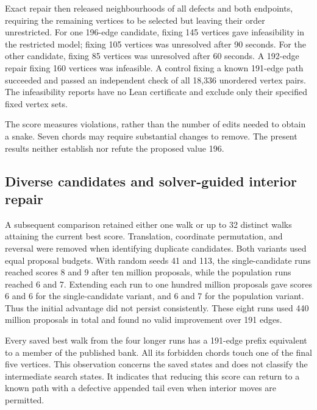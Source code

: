 \documentclass[11pt,a4paper]{article}
\theoremstyle{definition}
\theoremstyle{remark}
\begin{document}
Exact repair then released neighbourhoods of all defects and both endpoints, requiring the remaining vertices to be selected but leaving their order unrestricted. For one 196-edge candidate, fixing 145 vertices gave infeasibility in the restricted model; fixing 105 vertices was unresolved after 90 seconds. For the other candidate, fixing 85 vertices was unresolved after 60 seconds. A 192-edge repair fixing 160 vertices was infeasible. A control fixing a known 191-edge path succeeded and passed an independent check of all 18,336 unordered vertex pairs. The infeasibility reports have no Lean certificate and exclude only their specified fixed vertex sets.

The score measures violations, rather than the number of edits needed to obtain a snake. Seven chords may require substantial changes to remove. The present results neither establish nor refute the proposed value 196.

\subsection{Diverse candidates and solver-guided interior repair}
A subsequent comparison retained either one walk or up to 32 distinct walks attaining the current best score. Translation, coordinate permutation, and reversal were removed when identifying duplicate candidates. Both variants used equal proposal budgets. With random seeds 41 and 113, the single-candidate runs reached scores 8 and 9 after ten million proposals, while the population runs reached 6 and 7. Extending each run to one hundred million proposals gave scores 6 and 6 for the single-candidate variant, and 6 and 7 for the population variant. Thus the initial advantage did not persist consistently. These eight runs used 440 million proposals in total and found no valid improvement over 191 edges.

Every saved best walk from the four longer runs has a 191-edge prefix equivalent to a member of the published bank. All its forbidden chords touch one of the final five vertices. This observation concerns the saved states and does not classify the intermediate search states. It indicates that reducing this score can return to a known path with a defective appended tail even when interior moves are permitted.
\end{document}
